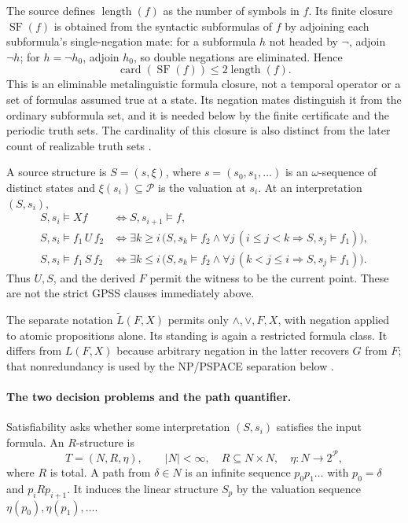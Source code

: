 The source defines \(\operatorname{length}(f)\) as the number of symbols in
\(f\).  Its finite closure \(\operatorname{SF}(f)\) is obtained from the
syntactic subformulas of \(f\) by adjoining each subformula's
single-negation mate: for a subformula \(h\) not headed by \(\neg\), adjoin
\(\neg h\); for \(h=\neg h_0\), adjoin \(h_0\), so double negations are
eliminated.  Hence
\[
 \operatorname{card}(\operatorname{SF}(f))
 \le 2\operatorname{length}(f).
\]
This is an eliminable metalinguistic formula closure, not a temporal
operator or a set of formulas assumed true at a state.  Its negation mates
distinguish it from the ordinary subformula set, and it is needed below by
the finite certificate and the periodic truth sets.  The cardinality of this
closure is also distinct from the later count of realizable truth sets
\cite[p.~735]{SistlaClarke1985}.

A source structure is \(S=(s,\xi)\), where
\(s=(s_0,s_1,\ldots)\) is an \(\omega\)-sequence of distinct states and
\(\xi(s_i)\subseteq\mathcal P\) is the valuation at \(s_i\).  At an
interpretation \((S,s_i)\),
\[
\begin{aligned}
 S,s_i\models Xf
 &\Longleftrightarrow S,s_{i+1}\models f,\\
 S,s_i\models f_1\,U\,f_2
 &\Longleftrightarrow
   \exists k\ge i\,
   \bigl(S,s_k\models f_2\land
         \forall j\,(i\le j<k\Rightarrow S,s_j\models f_1)\bigr),\\
 S,s_i\models f_1\,S\,f_2
 &\Longleftrightarrow
   \exists k\le i\,
   \bigl(S,s_k\models f_2\land
         \forall j\,(k<j\le i\Rightarrow S,s_j\models f_1)\bigr).
\end{aligned}
\]
Thus \(U,S\), and the derived \(F\) permit the witness to be the current
point.  These are not the strict GPSS clauses immediately above.

The separate notation \(\widetilde L(F,X)\) permits only
\(\land,\lor,F,X\), with negation applied to atomic propositions alone.  Its
standing is again a restricted formula class.  It differs from \(L(F,X)\)
because arbitrary negation in the latter recovers \(G\) from \(F\); that
nonredundancy is used by the NP/PSPACE separation below
\cite[pp.~734--735, 748]{SistlaClarke1985}.

\paragraph{The two decision problems and the path quantifier.}
Satisfiability asks whether some interpretation \((S,s_i)\) satisfies the
input formula.  An \(R\)-structure is
\[
 T=(N,R,\eta),
 \qquad
 |N|<\infty,\quad
 R\subseteq N\times N,\quad
 \eta:N\longrightarrow 2^{\mathcal P},
\]
where \(R\) is total.  A path from \(\delta\in N\) is an infinite sequence
\(p_0p_1\ldots\) with \(p_0=\delta\) and \(p_iRp_{i+1}\).  It induces the
linear structure \(S_p\) by the valuation sequence
\(\eta(p_0),\eta(p_1),\ldots\).

